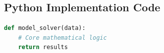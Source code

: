 \begin{appendices}
\section{Python Implementation Code}
\begin{lstlisting}[language=Python]
def model_solver(data):
    # Core mathematical logic
    return results
\end{lstlisting}
\end{appendices}
